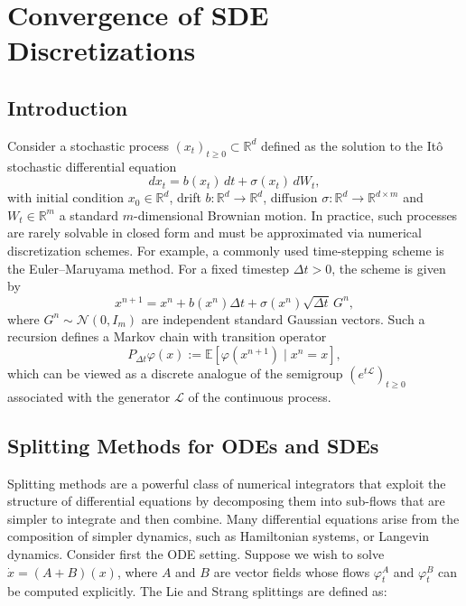 \documentclass[11pt, twoside]{report}
\begin{document}
\section{Convergence of SDE Discretizations}

\subsection{Introduction}

Consider a stochastic process $(x_t)_{t \geq 0} \subset \mathbb{R}^d$ defined as the solution to the Itô stochastic differential equation
\[
dx_t = b(x_t)\,dt + \sigma(x_t)\,dW_t,
\]
with initial condition $x_0 \in \mathbb{R}^d$, drift $b: \mathbb{R}^d \to \mathbb{R}^d$, diffusion $\sigma: \mathbb{R}^d \to \mathbb{R}^{d \times m}$ and $W_t \in \mathbb{R}^m$ a standard $m$-dimensional Brownian motion. In practice, such processes are rarely solvable in closed form and must be approximated via numerical discretization schemes. For example, a commonly used time-stepping scheme is the Euler–Maruyama method. For a fixed timestep $\Delta t > 0$, the scheme is given by
\[
x^{n+1} = x^n + b(x^n)\Delta t + \sigma(x^n)\sqrt{\Delta t}\, G^n,
\]
where $G^n \sim \mathcal{N}(0, I_m)$ are independent standard Gaussian vectors. Such a recursion defines a Markov chain with transition operator
\begin{equation} \label{discrete_transition}
    P_{\Delta t} \varphi(x) := \mathbb{E}[\varphi(x^{n+1}) \mid x^n = x],
\end{equation}
which can be viewed as a discrete analogue of the semigroup $(e^{t\mathcal{L}})_{t \geq 0}$ associated with the generator $\mathcal{L}$ of the continuous process.

\subsection{Splitting Methods for ODEs and SDEs}\label{sec:splitting_methods}

Splitting methods are a powerful class of numerical integrators that exploit the structure of differential equations by decomposing them into sub-flows that are simpler to integrate and then combine. Many differential equations arise from the composition of simpler dynamics, such as Hamiltonian systems, or Langevin dynamics. Consider first the ODE setting. Suppose we wish to solve $\dot{x} = (A + B)(x)$, where $A$ and $B$ are vector fields whose flows $\varphi^A_t$ and $\varphi^B_t$ can be computed explicitly. The Lie and Strang splittings are defined as:
\end{document}
